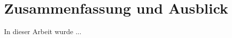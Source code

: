 \chapter{Zusammenfassung und Ausblick}
\label{chap: Zusammenfassung und Ausblick}
In dieser Arbeit wurde ...

